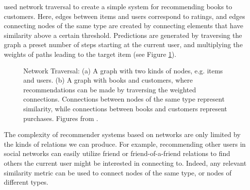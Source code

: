 \cite{Huang2002} used network traversal to create a simple system for recommending books to customers.
Here, edges between items and users correspond to ratings, and edges connecting nodes of the same type
are created by connecting elements that have similarity above a certain threshold. Predictions are generated
by traversing the graph a preset number of steps starting at the current user, and multiplying the weights
of paths leading to the target item (see Figure \ref{fig:book-graphs}).

\begin{figure}[t]
  \centering
  \caption[Network Traversal]{Network Traversal: (a) A graph with two kinds of nodes,
    e.g. items and users. (b) A graph with books and customers, where recommendations
    can be made by traversing the weighted connections. Connections between nodes of the same type
    represent similarity, while connections between books and customers represent purchases.
    Figures from \cite{Huang2002}.}
  \label{fig:book-graphs}
\end{figure}

The complexity of recommender systems based on networks are only limited by the kinds of relations we can produce.
For example, recommending other users in social networks can easily utilize friend or friend-of-a-friend relations
to find others the current user might be interested in connecting to. Indeed, any relevant similarity metric can be used to
connect nodes of the same type, or nodes of different types.

